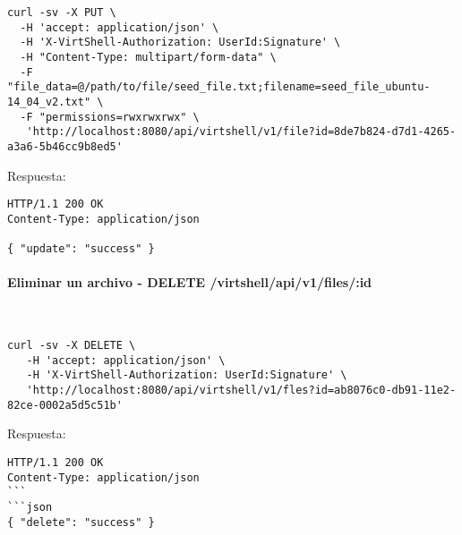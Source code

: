 \begin{lstlisting}[style=json]
curl -sv -X PUT \
  -H 'accept: application/json' \
  -H 'X-VirtShell-Authorization: UserId:Signature' \
  -H "Content-Type: multipart/form-data" \
  -F "file_data=@/path/to/file/seed_file.txt;filename=seed_file_ubuntu-14_04_v2.txt" \
  -F "permissions=rwxrwxrwx" \
   'http://localhost:8080/api/virtshell/v1/file?id=8de7b824-d7d1-4265-a3a6-5b46cc9b8ed5'
\end{lstlisting}

\vspace{1cm}
Respuesta:
\vspace{1cm}

\begin{lstlisting}[style=json]
HTTP/1.1 200 OK
Content-Type: application/json

{ "update": "success" }
\end{lstlisting}


\paragraph{Eliminar un archivo - DELETE /virtshell/api/v1/files/:id} ~\\

\begin{lstlisting}[style=json]
curl -sv -X DELETE \
   -H 'accept: application/json' \
   -H 'X-VirtShell-Authorization: UserId:Signature' \
   'http://localhost:8080/api/virtshell/v1/fles?id=ab8076c0-db91-11e2-82ce-0002a5d5c51b'
\end{lstlisting}

\vspace{1cm}
Respuesta:
\vspace{1cm}

\begin{lstlisting}[style=json]
HTTP/1.1 200 OK
Content-Type: application/json
```
```json
{ "delete": "success" }
\end{lstlisting}
